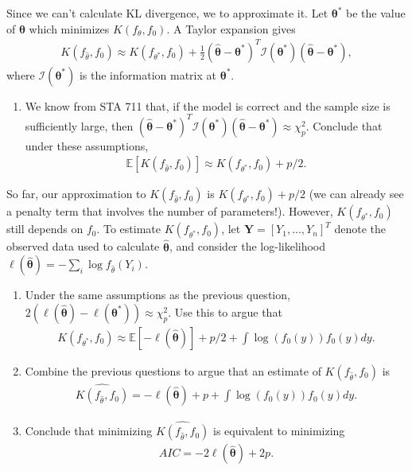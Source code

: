 \documentclass[11pt]{article}
\begin{document}
\noindent Since we can't calculate KL divergence, we to approximate it. Let $\bm{\theta}^*$ be the value of $\bm{\theta}$ which minimizes $K(f_\theta, f_0)$. A Taylor expansion gives
\begin{align}
K(f_{\widehat{\theta}}, f_0) \approx K(f_{\theta^*}, f_0) + \frac{1}{2} (\widehat{\bm{\theta}} - \bm{\theta}^*)^T \mathcal{I}(\bm{\theta}^*) (\widehat{\bm{\theta}} - \bm{\theta}^*),
\end{align}
where $\mathcal{I}(\bm{\theta}^*)$ is the information matrix at $\bm{\theta}^*$.

\begin{enumerate}
\item We know from STA 711 that, if the model is correct and the sample size is sufficiently large, then $(\widehat{\bm{\theta}} - \bm{\theta}^*)^T \mathcal{I}(\bm{\theta}^*) (\widehat{\bm{\theta}} - \bm{\theta}^*) \approx \chi^2_p$. Conclude that under these assumptions,
\begin{align}
\mathbb{E}[K(f_{\widehat{\theta}}, f_0)] \approx K(f_{\theta^*}, f_0) + p/2.
\end{align}
\end{enumerate}

\noindent So far, our approximation to $K(f_{\widehat{\theta}}, f_0)$ is $K(f_{\theta^*}, f_0) + p/2$ (we can already see a penalty term that involves the number of parameters!). However, $K(f_{\theta^*}, f_0)$ still depends on $f_0$. To estimate $K(f_{\theta^*}, f_0)$, let $\bm{Y} = [Y_1,...,Y_n]^T$ denote the observed data used to calculate $\widehat{\bm{\theta}}$, and consider the log-likelihood $\ell(\widehat{\bm{\theta}}) = -\sum_i \log f_{\widehat{\theta}}(Y_i)$.

\begin{enumerate}
\item Under the same assumptions as the previous question, $2(\ell(\widehat{\bm{\theta}}) - \ell(\bm{\theta}^*)) \approx \chi^2_p$. Use this to argue that 
\begin{align}
K(f_{\theta^*}, f_0) \approx \mathbb{E}[- \ell(\widehat{\bm{\theta}})] + p/2 + \int \log(f_0(y)) f_0(y) dy.
\end{align}

\item Combine the previous questions to argue that an estimate of $K(f_{\widehat{\theta}}, f_0)$ is
\begin{align}
\widehat{K(f_{\widehat{\theta}}, f_0)} = -\ell(\widehat{\bm{\theta}}) + p + \int \log(f_0(y)) f_0(y) dy.
\end{align}

\item Conclude that minimizing $\widehat{K(f_{\widehat{\theta}}, f_0)}$ is equivalent to minimizing
\begin{align*}
AIC = -2\ell(\widehat{\bm{\theta}}) + 2p.
\end{align*}
\end{enumerate}
\end{document}
